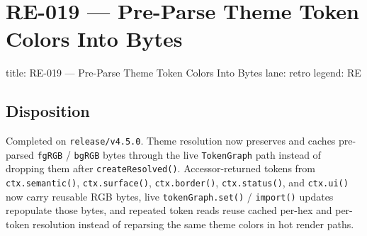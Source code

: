 \chapter{RE-019 --- Pre-Parse Theme Token Colors Into Bytes}\label{record-369}

\smallskip

\begin{RecordMeta}
title: RE-019 — Pre-Parse Theme Token Colors Into Bytes
lane: retro
legend: RE

\end{RecordMeta}

\section{Disposition}\label{record-369-disposition}

Completed on \texttt{r\allowbreak{}e\allowbreak{}l\allowbreak{}e\allowbreak{}a\allowbreak{}s\allowbreak{}e\allowbreak{}/\allowbreak{}v\allowbreak{}4\allowbreak{}.\allowbreak{}5\allowbreak{}.\allowbreak{}0}. Theme resolution now preserves and caches pre-parsed \texttt{f\allowbreak{}g\allowbreak{}R\allowbreak{}G\allowbreak{}B} / \texttt{b\allowbreak{}g\allowbreak{}R\allowbreak{}G\allowbreak{}B} bytes through the live \texttt{T\allowbreak{}o\allowbreak{}k\allowbreak{}e\allowbreak{}n\allowbreak{}G\allowbreak{}r\allowbreak{}a\allowbreak{}p\allowbreak{}h} path instead of dropping them after \texttt{c\allowbreak{}r\allowbreak{}e\allowbreak{}a\allowbreak{}t\allowbreak{}e\allowbreak{}R\allowbreak{}e\allowbreak{}s\allowbreak{}o\allowbreak{}l\allowbreak{}v\allowbreak{}e\allowbreak{}d\allowbreak{}(\allowbreak{})}. Accessor-returned tokens from \texttt{c\allowbreak{}t\allowbreak{}x\allowbreak{}.\allowbreak{}s\allowbreak{}e\allowbreak{}m\allowbreak{}a\allowbreak{}n\allowbreak{}t\allowbreak{}i\allowbreak{}c\allowbreak{}(\allowbreak{})}, \texttt{c\allowbreak{}t\allowbreak{}x\allowbreak{}.\allowbreak{}s\allowbreak{}u\allowbreak{}r\allowbreak{}f\allowbreak{}a\allowbreak{}c\allowbreak{}e\allowbreak{}(\allowbreak{})}, \texttt{c\allowbreak{}t\allowbreak{}x\allowbreak{}.\allowbreak{}b\allowbreak{}o\allowbreak{}r\allowbreak{}d\allowbreak{}e\allowbreak{}r\allowbreak{}(\allowbreak{})}, \texttt{c\allowbreak{}t\allowbreak{}x\allowbreak{}.\allowbreak{}s\allowbreak{}t\allowbreak{}a\allowbreak{}t\allowbreak{}u\allowbreak{}s\allowbreak{}(\allowbreak{})}, and \texttt{c\allowbreak{}t\allowbreak{}x\allowbreak{}.\allowbreak{}u\allowbreak{}i\allowbreak{}(\allowbreak{})} now carry reusable RGB bytes, live \texttt{t\allowbreak{}o\allowbreak{}k\allowbreak{}e\allowbreak{}n\allowbreak{}G\allowbreak{}r\allowbreak{}a\allowbreak{}p\allowbreak{}h\allowbreak{}.\allowbreak{}s\allowbreak{}e\allowbreak{}t\allowbreak{}(\allowbreak{})} / \texttt{i\allowbreak{}m\allowbreak{}p\allowbreak{}o\allowbreak{}r\allowbreak{}t\allowbreak{}(\allowbreak{})} updates repopulate those bytes, and repeated token reads reuse cached per-hex and per-token resolution instead of reparsing the same theme colors in hot render paths.

